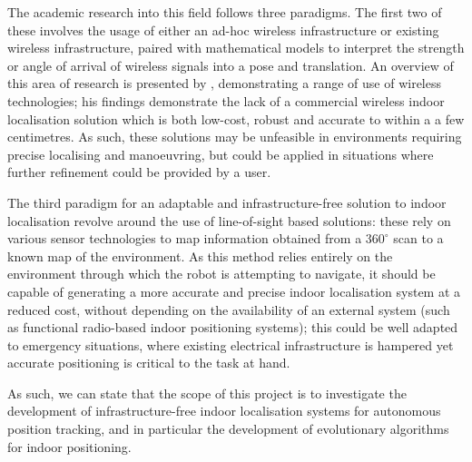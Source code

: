 \documentclass[authoryearcitations]{UoYCSproject}
\begin{document}
The academic research into this field follows three paradigms. The first two of these involves the usage of either an ad-hoc wireless infrastructure or existing wireless infrastructure, paired with mathematical models to interpret the strength or angle of arrival of wireless signals into a pose and translation. An overview of this area of research is presented by \citet{Liu2007-in}, demonstrating a range of use of wireless technologies; his findings demonstrate the lack of a commercial wireless indoor localisation solution which is both low-cost, robust and accurate to within a a few centimetres. As such, these solutions may be unfeasible in environments requiring precise localising and manoeuvring, but could be applied in situations where further refinement could be provided by a user. 
\newline

The third paradigm for an adaptable and infrastructure-free solution to indoor localisation revolve around the use of line-of-sight based solutions: these rely on various sensor technologies to map information obtained from a  $360^{\circ}$ scan to a known map of the environment. As this method relies entirely on the environment through which the robot is attempting to navigate, it should be capable of generating a more accurate and precise indoor localisation system at a reduced cost, without depending on the availability of an external system (such as functional radio-based indoor positioning systems); this could be well adapted to emergency situations, where existing electrical infrastructure is hampered yet accurate positioning is critical to the task at hand. 
\newline

As such, we can state that the scope of this project is to investigate the development of infrastructure-free indoor localisation systems for autonomous position tracking, and in particular the development of evolutionary algorithms for indoor positioning.
\newline
\end{document}

